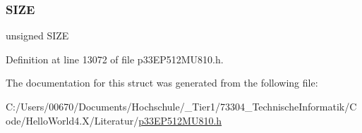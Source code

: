 \subsubsection{\texorpdfstring{S\+I\+ZE}{SIZE}}
{\footnotesize\ttfamily unsigned S\+I\+ZE}



Definition at line 13072 of file p33\+E\+P512\+M\+U810.\+h.



The documentation for this struct was generated from the following file\+:\begin{DoxyCompactItemize}
\item 
C\+:/\+Users/00670/\+Documents/\+Hochschule/\+\_\+\+Tier1/73304\+\_\+\+Technische\+Informatik/\+Code/\+Hello\+World4.\+X/\+Literatur/\hyperlink{p33_e_p512_m_u810_8h}{p33\+E\+P512\+M\+U810.\+h}\end{DoxyCompactItemize}
